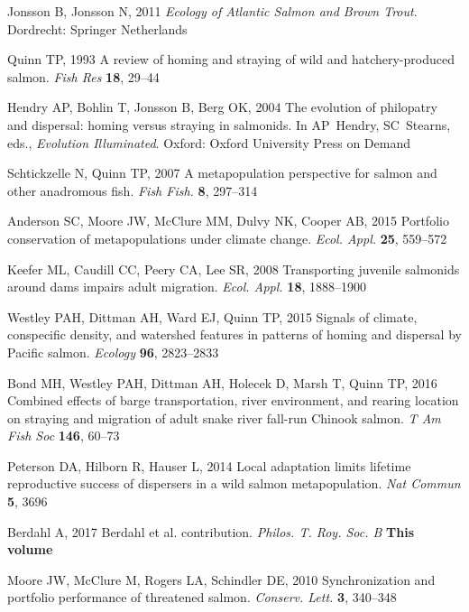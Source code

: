 \documentclass{revtex4}
\begin{document}
\begin{thebibliography}{10}
Jonsson B, Jonsson N, 2011 \emph{{Ecology of Atlantic Salmon and Brown Trout}}.
\newblock Dordrecht: Springer Netherlands

Quinn TP, 1993 {A review of homing and straying of wild and hatchery-produced
  salmon}.
\newblock \emph{Fish Res} \textbf{18}, 29--44

Hendry AP, Bohlin T, Jonsson B, Berg OK, 2004 {The evolution of philopatry and
  dispersal: homing versus straying in salmonids}.
\newblock In AP~Hendry, SC~Stearns, eds., \emph{Evolution Illuminated}. Oxford:
  Oxford University Press on Demand

Schtickzelle N, Quinn TP, 2007 {A metapopulation perspective for salmon and
  other anadromous fish}.
\newblock \emph{Fish Fish.} \textbf{8}, 297--314

Anderson SC, Moore JW, McClure MM, Dulvy NK, Cooper AB, 2015 {Portfolio
  conservation of metapopulations under climate change}.
\newblock \emph{Ecol. Appl.} \textbf{25}, 559--572

Keefer ML, Caudill CC, Peery CA, Lee SR, 2008 {Transporting juvenile salmonids
  around dams impairs adult migration}.
\newblock \emph{Ecol. Appl.} \textbf{18}, 1888--1900

Westley PAH, Dittman AH, Ward EJ, Quinn TP, 2015 {Signals of climate,
  conspecific density, and watershed features in patterns of homing and
  dispersal by Pacific salmon.}
\newblock \emph{Ecology} \textbf{96}, 2823--2833

Bond MH, Westley PAH, Dittman AH, Holecek D, Marsh T, Quinn TP, 2016 {Combined
  effects of barge transportation, river environment, and rearing location on
  straying and migration of adult snake river fall-run Chinook salmon}.
\newblock \emph{T Am Fish Soc} \textbf{146}, 60--73

Peterson DA, Hilborn R, Hauser L, 2014 {Local adaptation limits lifetime
  reproductive success of dispersers in a wild salmon metapopulation}.
\newblock \emph{Nat Commun} \textbf{5}, 3696

Berdahl A, 2017 {Berdahl et al. contribution}.
\newblock \emph{Philos. T. Roy. Soc. B} \textbf{This volume}

Moore JW, McClure M, Rogers LA, Schindler DE, 2010 {Synchronization and
  portfolio performance of threatened salmon}.
\newblock \emph{Conserv. Lett.} \textbf{3}, 340--348


\end{thebibliography}
\end{document}

